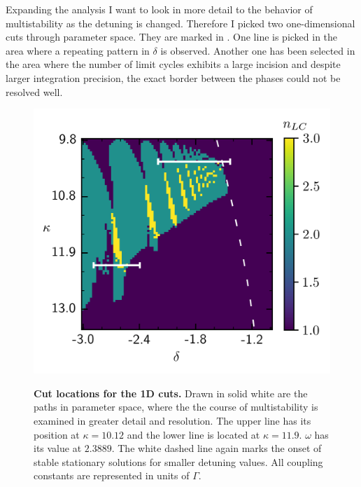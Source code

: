 Expanding the analysis I want to look in more detail to the behavior of multistability as the detuning is changed. Therefore I picked two one-dimensional cuts through parameter space. They are marked in . One line is picked in the area where a repeating pattern in $\delta$ is observed. Another one has been selected in the area where the number of limit cycles exhibits a large incision and despite larger integration precision, the exact border between the phases could not be resolved well.
%     
\begin{figure}[H]
    \caption{\textbf{Cut locations for the 1D cuts.} Drawn in solid white are the paths in parameter space, where the the course of multistability is examined in greater detail and resolution. The upper line has its position at $\kappa=10.12$ and the lower line is located at $\kappa=11.9$. $\omega$ has its value at $2.3889$. The white dashed line again marks the onset of stable stationary solutions for smaller detuning values. All coupling constants are represented in units of $\Gamma$.}
    \includegraphics{pictures/multistab_cuts.png}
    \label{fig:delta_cut_traj}
\end{figure}


